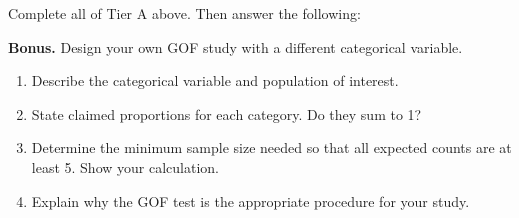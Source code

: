 \documentclass[10pt]{article}
\begin{document}
\begin{tcolorbox}[colback=white, colframe=black!40,
    title=\textbf{Tier E --- Extension},
    fonttitle=\bfseries, arc=2mm, left=3mm, right=3mm, top=2mm, bottom=2mm]

Complete all of Tier A above. Then answer the following:

\textbf{Bonus.} Design your own GOF study with a different categorical variable.

\begin{enumerate}[label=\alph*.]
  \item Describe the categorical variable and population of interest. 

  \item State claimed proportions for each category. Do they sum to 1? 

  \item Determine the minimum sample size needed so that all expected counts are at
        least 5. Show your calculation. 

  \item Explain why the GOF test is the appropriate procedure for your study.
\end{enumerate}
\end{tcolorbox}
\end{document}

